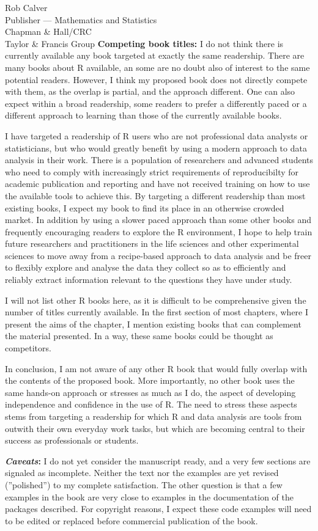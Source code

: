 \documentclass[a4paper]{scrlttr2}
\begin{document}
\begin{letter}{Rob Calver\\Publisher --- Mathematics and Statistics\\ Chapman \& Hall/CRC\\ Taylor \& Francis Group}
\textbf{Competing book titles:} I do not think there is currently available any book targeted at exactly the same readership. There are many books about R available, an some are no doubt also of interest to the same potential readers. However, I think my proposed book does not directly compete with them, as the overlap is partial, and the approach different. One can also expect within a broad readership, some readers to prefer a differently paced or a different approach to learning than those of the currently available books.

I have targeted a readership of R users who are not professional data analysts or statisticians, but who would greatly benefit by using a modern approach to data analysis in their work. There is a population of researchers and advanced students who need to comply with increasingly strict requirements of reproducibilty for academic publication and reporting and have not received training on how to use the available tools to achieve this. By targeting a different readership than most existing books, I expect my book to find its place in an otherwise crowded market. In addition by using a slower paced approach than some other books and frequently encouraging readers to explore the R environment, I hope to help train future researchers and practitioners in the life sciences and other experimental sciences to move away from a recipe-based approach to data analysis and be freer to flexibly explore and analyse the data they collect so as to efficiently and reliably extract information relevant to the questions they have under study.

I will not list other R books here, as it is difficult to be comprehensive given the number of titles currently available. In the first section of most chapters, where I present the aims of the chapter, I mention existing books that can complement the material presented. In a way, these same books could be thought as competitors.

In conclusion, I am not aware of any other R book that would fully overlap with the contents of the proposed book. More importantly, no other book uses the same hands-on approach or stresses as much as I do, the aspect of developing independence and confidence in the use of R. The need to stress these aspects stems from targeting a readership for which R and data analysis are tools from outwith their own everyday work tasks, but which are becoming central to their success as professionals or students.

\textbf{\emph{Caveats}:} I do not yet consider the manuscript ready, and a very few sections are signaled as incomplete. Neither the text nor the examples are yet revised (''polished'') to my complete satisfaction. The other question is that a few examples in the book are very close to examples in the documentation of the packages described. For copyright reasons, I expect these code examples will need to be edited or replaced before commercial publication of the book.


\end{letter}
\end{document}
